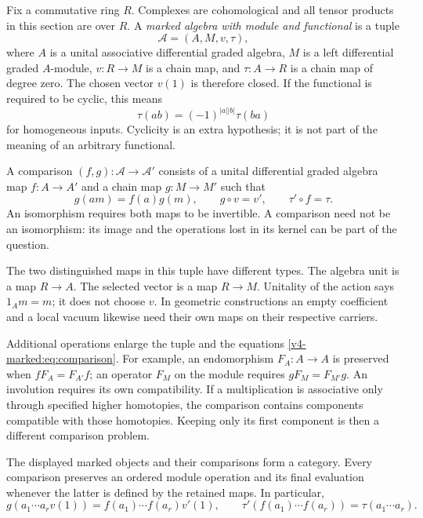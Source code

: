 Fix a commutative ring \(R\). Complexes are cohomological and all
tensor products in this section are over \(R\). A \emph{marked
algebra with module and functional} is a tuple
\[
 \mathcal A=(A,M,v,\tau),
\]
where \(A\) is a unital associative differential graded algebra,
\(M\) is a left differential graded \(A\)-module,
\(v:R\to M\) is a chain map, and \(\tau:A\to R\) is a
chain map of degree zero. The chosen vector \(v(1)\) is therefore
closed. If the functional is required to be cyclic, this means
\[
 \tau(ab)=(-1)^{|a||b|}\tau(ba)
\]
for homogeneous inputs. Cyclicity is an extra hypothesis; it is not
part of the meaning of an arbitrary functional.

A comparison \((f,g):\mathcal A\to\mathcal A'\) consists of a
unital differential graded algebra map \(f:A\to A'\) and a
chain map \(g:M\to M'\) such that
\begin{equation}\label{v4-marked:eq:comparison}
 g(am)=f(a)g(m),\qquad
 g\circ v=v',\qquad
 \tau'\circ f=\tau.
\end{equation}
An isomorphism requires both maps to be invertible. A comparison need
not be an isomorphism: its image and the operations lost in its kernel
can be part of the question.

The two distinguished maps in this tuple have different types. The
algebra unit is a map \(R\to A\). The selected vector is a map
\(R\to M\). Unitality of the action says \(1_Am=m\); it does
not choose \(v\). In geometric constructions an empty coefficient
and a local vacuum likewise need their own maps on their respective
carriers.

Additional operations enlarge the tuple and the equations
\eqref{v4-marked:eq:comparison}. For example, an endomorphism
\(F_A:A\to A\) is preserved when \(fF_A=F_{A'}f\); an
operator \(F_M\) on the module requires \(gF_M=F_{M'}g\).
An involution requires its own compatibility. If a multiplication is
associative only through specified higher homotopies, the comparison
contains components compatible with those homotopies. Keeping only
its first component is then a different comparison problem.

\begin{proposition}\label{v4-marked:prop:composition}
The displayed marked objects and their comparisons form a category.
Every comparison preserves an ordered module operation and its final
evaluation whenever the latter is defined by the retained maps. In
particular,
\[
 g(a_1\cdots a_r v(1))
 =f(a_1)\cdots f(a_r)v'(1),
 \qquad
 \tau'(f(a_1)\cdots f(a_r))=\tau(a_1\cdots a_r).
\]
\end{proposition}

